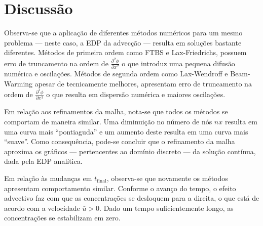 \chapter{Discussão}

Observa-se que a aplicação de diferentes métodos numéricos para um mesmo
problema --- neste caso, a EDP da advecção --- resulta em soluções bastante
diferentes. Métodos de primeira ordem como FTBS e Lax-Friedrichs, possuem erro
de truncamento na ordem de $\frac{\partial^2\phi}{\partial x^2}$ o que introduz
uma pequena difusão numérica e oscilações. Métodos de segunda ordem como
Lax-Wendroff e Beam-Warming apesar de tecnicamente melhores, apresentam erro de
truncamento na ordem de $\frac{\partial^3\phi}{\partial x^3}$ o que resulta em
dispersão numérica e maiores oscilações.

Em relação aos refinamentos da malha, nota-se que todos os métodos se comportam
de maneira similar. Uma diminuição no número de nós $nx$ resulta em uma curva
mais ``pontiaguda'' e um aumento deste resulta em uma curva mais ``suave''.
Como consequência, pode-se concluir que o refinamento da malha aproxima os
gráficos --- pertencentes ao domínio discreto --- da solução contínua, dada
pela EDP analítica.

Em relação às mudanças em $t_{\text{final}}$, observa-se que novamente os
métodos apresentam comportamento similar. Conforme o avanço do tempo, o efeito
advectivo faz com que as concentrações se desloquem para a direita, o que está
de acordo com a velocidade $\bar{u} > 0$. Dado um tempo suficientemente longo,
as concentrações se estabilizam em zero.